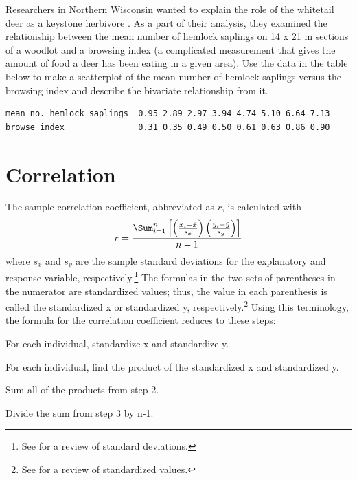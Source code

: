 \documentclass[10pt,openany]{book}\usepackage[]{graphicx}\usepackage[]{color}
\begin{document}
\begin{exsection}
  \item \label{revex:qbEDAScat} \rhw{}Researchers in Northern Wisconsin wanted to explain the role of the whitetail deer as a keystone herbivore \citep{WallerAlverson1997}.  As a part of their analysis, they examined the relationship between the mean number of hemlock saplings on 14 x 21 m sections of a woodlot and a browsing index (a complicated measurement that gives the amount of food a deer has been eating in a given area).  Use the data in the table below to make a scatterplot of the mean number of hemlock saplings versus the browsing index and describe the bivariate relationship from it. 
  \begin{Verbatim}
mean no. hemlock saplings  0.95 2.89 2.97 3.94 4.74 5.10 6.64 7.13
browse index               0.31 0.35 0.49 0.50 0.61 0.63 0.86 0.90
  \end{Verbatim}
\end{exsection}


\vspace{-18pt}
\section{Correlation}\label{sect:corr}
The sample correlation coefficient, abbreviated as $r$, is calculated with
\begin{equation}
  r = \frac{\Sum_{i=1}^{n}\left[\left(\frac{x_{i}-\bar{x}}{s_{x}}\right)\left(\frac{y_{i}-\bar{y}}{s_{y}}\right)\right]}{n-1}
\end{equation}
where $s_{x}$ and $s_{y}$ are the sample standard deviations for the explanatory and response variable, respectively.\footnote{See  for a review of standard deviations.}  The formulas in the two sets of parentheses in the numerator are standardized values; thus, the value in each parenthesis is called the standardized x or standardized y, respectively.\footnote{See  for a review of standardized values.}  Using this terminology, the formula for the correlation coefficient reduces to these steps:
\begin{Enumerate}
  \item For each individual, standardize x and standardize y.
  \item For each individual, find the product of the standardized x and standardized y.
  \item Sum all of the products from step 2.
  \item Divide the sum from step 3 by n-1.
\end{Enumerate}
\end{document}
